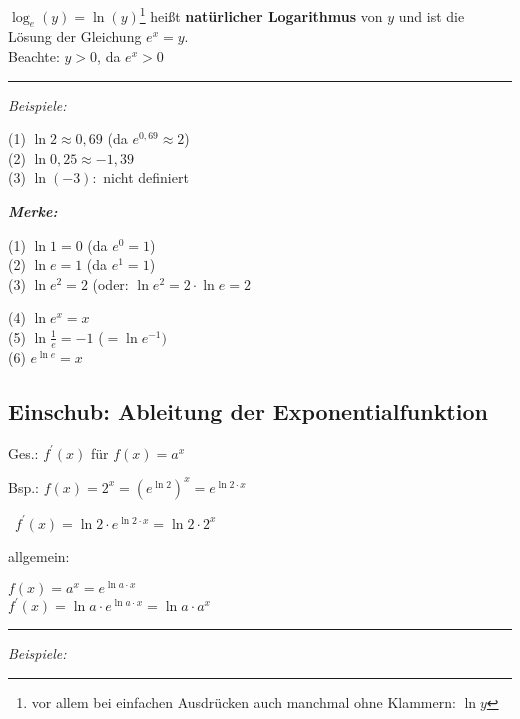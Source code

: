 \begin{definition}
    $\log_{e}(y) =\ln{(y)}$\footnote{vor allem bei einfachen Ausdrücken auch manchmal ohne Klammern: $\ln{y}$} heißt \textbf{natürlicher Logarithmus} von $y$ und ist die Lösung der Gleichung $e^x = y$. \\Beachte: $y>0$, da $e^x >0$
\end{definition}
\noindent\rule{\textwidth}{1pt}

\textit{Beispiele:}

(1) $\ln{2} \approx 0,69$ (da $e^{0,69} \approx 2$) \\
(2) $\ln{0,25} \approx -1,39$ \\
(3) $\ln{(-3)}:$ nicht definiert

\textit{\textbf{Merke:}}

\begin{minipage}{0.5\textwidth}
    (1) $\ln{1} = 0$ (da $e^0 = 1$) \\
    (2) $\ln{e} = 1$ (da $e^1 = 1$) \\
    (3) $\ln{e^2} = 2$ (oder: $\ln{e^2} = 2 \cdot \ln{e} = 2$
\end{minipage}
\begin{minipage}{0.5\textwidth}
    (4) $\ln{e^x} = x$ \\
    (5) $\ln{\frac{1}{e}} = -1$ ($=\ln{e^{-1}})$ \\
    (6) $e^{\ln{e}} = x$
\end{minipage}


\subsection{Einschub: Ableitung der Exponentialfunktion}
Ges.: $f^\prime(x)$ für $f(x) = a^x$

Bsp.: $f(x) = 2^x = (e^{\ln{2}})^x = e^{\ln{2} \cdot x}$

\qquad \ $f^\prime(x) = \ln2 \cdot e^{\ln{2} \cdot x} = \ln{2} \cdot 2^x$

allgemein: 

$f(x) = a^x = e^{\ln{a} \cdot x}$\\
$f^\prime(x) = \ln{a} \cdot e^{\ln{a} \cdot x} = \ln{a} \cdot a^x$

\noindent\rule{\textwidth}{1pt}

\textit{Beispiele:}

